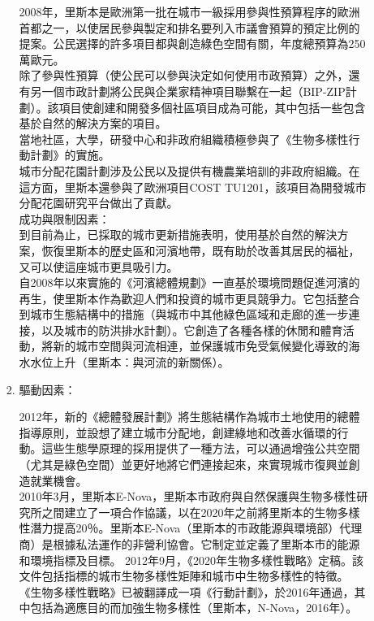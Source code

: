 \documentclass[a4paper,12pt]{article}
\begin{document}
\begin{enumerate}
\begin{enumerate}
\begin{enumerate}
2008年，里斯本是歐洲第一批在城市一級採用參與性預算程序的歐洲首都之一，以使居民參與製定和排名要列入市議會預算的預定比例的提案。公民選擇的許多項目都與創造綠色空間有關，年度總預算為250萬歐元。\\

除了參與性預算（使公民可以參與決定如何使用市政預算）之外，還有另一個市政計劃將公民與企業家精神項目聯繫在一起（BIP-ZIP計劃）。該項目使創建和開發多個社區項目成為可能，其中包括一些包含基於自然的解決方案的項目。\\

當地社區，大學，研發中心和非政府組織積極參與了《生物多樣性行動計劃》的實施。\\

城市分配花園計劃涉及公民以及提供有機農業培訓的非政府組織。在這方面，里斯本還參與了歐洲項目COST TU1201，該項目為開發城市分配花園研究平台做出了貢獻。\\
成功與限制因素：\\

到目前為止，已採取的城市更新措施表明，使用基於自然的解決方案，恢復里斯本的歷史區和河濱地帶，既有助於改善其居民的福祉，又可以使這座城市更具吸引力。\\

自2008年以來實施的《河濱總體規劃》一直基於環境問題促進河濱的再生，使里斯本作為歡迎人們和投資的城市更具競爭力。它包括整合到城市生態結構中的措施（與城市中其他綠色區域和走廊的進一步連接，以及城市的防洪排水計劃）。它創造了各種各樣的休閒和體育活動，將新的城市空間與河流相連，並保護城市免受氣候變化導致的海水水位上升（里斯本：與河流的新關係）。\\
\item 驅動因素：
\label{sec:org0c9450b}

2012年，新的《總體發展計劃》將生態結構作為城市土地使用的總體指導原則，並設想了建立城市分配地，創建綠地和改善水循環的行動。這些生態學原理的採用提供了一種方法，可以通過增強公共空間（尤其是綠色空間）並更好地將它們連接起來，來實現城市復興並創造就業機會。\\

2010年3月，里斯本E-Nova，里斯本市政府與自然保護與生物多樣性研究所之間建立了一項合作協議，以在2020年之前將里斯本的生物多樣性潛力提高20％。里斯本E-Nova（里斯本的市政能源與環境部）代理商）是根據私法運作的非營利協會。它制定並定義了里斯本市的能源和環境指標及目標。 2012年9月，《2020年生物多樣性戰略》定稿。該文件包括指標的城市生物多樣性矩陣和城市中生物多樣性的特徵。 《生物多樣性戰略》已被翻譯成一項《行動計劃》，於2016年通過，其中包括為適應目的而加強生物多樣性（里斯本，N-Nova，2016年）。\\


\end{enumerate}
\end{enumerate}
\end{enumerate}
\end{document}
